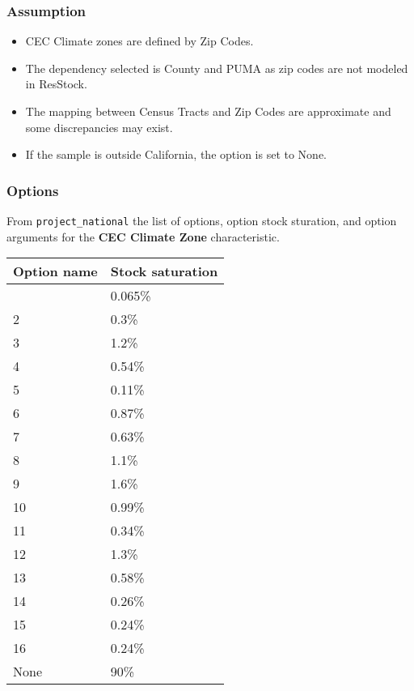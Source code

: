 \subsubsection{Assumption}\label{assumption-3}

\begin{itemize}
 
\item
  CEC Climate zones are defined by Zip Codes.
\item
  The dependency selected is County and PUMA as zip codes are not
  modeled in ResStock.
\item
  The mapping between Census Tracts and Zip Codes are approximate and
  some discrepancies may exist.
\item
  If the sample is outside California, the option is set to None.
\end{itemize}

\subsubsection{Options}\label{options-9}

From \texttt{project\_national} the list of options, option stock
sturation, and option arguments for the \textbf{CEC Climate Zone}
characteristic.

\begin{longtable}[]{@{}ll@{}}
\toprule\noalign{}
Option name & Stock saturation \\
\midrule\noalign{}
\endhead
\bottomrule\noalign{}
\endlastfoot
1 & 0.065\% \\
2 & 0.3\% \\
3 & 1.2\% \\
4 & 0.54\% \\
5 & 0.11\% \\
6 & 0.87\% \\
7 & 0.63\% \\
8 & 1.1\% \\
9 & 1.6\% \\
10 & 0.99\% \\
11 & 0.34\% \\
12 & 1.3\% \\
13 & 0.58\% \\
14 & 0.26\% \\
15 & 0.24\% \\
16 & 0.24\% \\
None & 90\% \\
\end{longtable}

